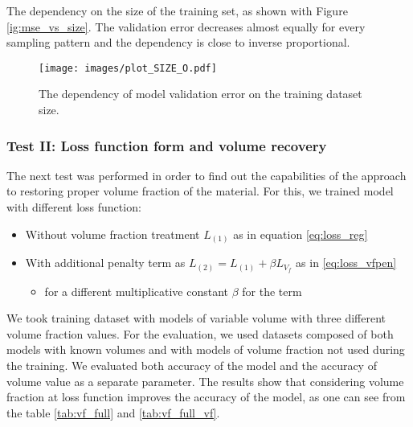 \medskip
The dependency on the size of the training set, as shown with Figure \ref{ig:mse_vs_size}.
The validation error decreases almost equally for every sampling pattern and the dependency is close to inverse proportional.
\begin{figure}[H]
	\centering
	\texttt{[image: images/plot\_SIZE\_O.pdf]}
	\caption{The dependency of model validation error on the training dataset size.}
	\label{fig:mse_vs_size}
\end{figure}

\medskip

\subsubsection{Test II: Loss function form and volume recovery}
The next test was performed in order to find out the capabilities of the approach to restoring proper volume fraction of the material. 
For this, we trained model with different loss function: 
\begin{itemize}
	\item Without volume fraction treatment $L_{(1)}$ as in equation \ref{eq:loss_reg}
	\item With additional penalty term as $L_{(2)}=L_{(1)}+\beta L_{V_{f}}$ as in \ref{eq:loss_vfpen}
	\begin{itemize}
		\item for a different multiplicative constant $\beta$ for the term
	\end{itemize}
\end{itemize}
We took training dataset with models of variable volume with three different volume fraction values.
For the evaluation, we used datasets composed of both models with known volumes and with models of volume fraction not used during the training.
We evaluated both accuracy of the model and the accuracy of volume value as a separate parameter.
The results show that considering volume fraction at loss function improves the accuracy of the model, as one can see from the table \ref{tab:vf_full} and \ref{tab:vf_full_vf}. 
